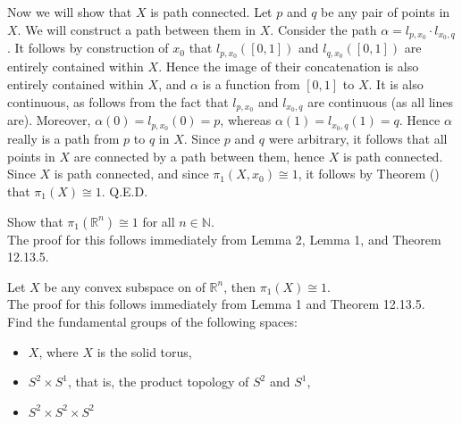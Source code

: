 \documentclass{article}
\newcommand{\N}{\mathbb{N}}
\newcommand{\R}{\mathbb{R}}
\newcommand{\N}{\mathbb{N}}
\newcommand{\R}{\mathbb{R}}
\begin{document}
Now we will show that $X$ is path connected. Let $p$ and $q$ be any pair of points in $X$. We will construct a path between them in $X$. Consider the path $\alpha = l_{p,x_0}\cdot l_{x_0,q}$. It follows by construction of $x_0$ that $l_{p,x_0}([0,1])$ and $l_{q,x_0}([0,1])$ are entirely contained within $X$. Hence the image of their concatenation is also entirely contained within $X$, and $\alpha$ is a function from $[0,1]$ to $X$. It is also continuous, as follows from the fact that $l_{p,x_0}$ and $l_{x_0, q}$ are continuous (as all lines are). Moreover, $\alpha(0) = l_{p,x_0}(0) = p$, whereas $\alpha(1) = l_{x_0,q}(1) = q$. Hence $\alpha$ really is a path from $p$ to $q$ in $X$. Since $p$ and $q$ were arbitrary, it follows that all points in $X$ are connected by a path between them, hence $X$ is path connected. \\

Since $X$ is path connected, and since $\pi_1(X,x_0)\cong 1$, it follows by Theorem () that $\pi_1(X)\cong 1$. Q.E.D.

 Show that $\pi_1(\R^n) \cong 1$ for all $n\in \N$.\\

 The proof for this follows immediately from Lemma 2, Lemma 1, and Theorem 12.13.5. 

 Let $X$ be any convex subspace on of $\R^n$, then $\pi_1(X) \cong 1$. \\

 The proof for this follows immediately from Lemma 1 and Theorem 12.13.5.\\


 Find the fundamental groups of the following spaces:
\begin{itemize}
    \item $X$, where $X$ is the solid torus,
    \item $S^2 \times S^1$, that is, the product topology of $S^2$ and $S^1$,
    \item $S^2\times S^2 \times S^2$
\end{itemize}
\end{document}
